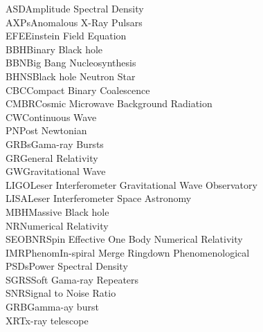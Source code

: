 ASD\hspace{2.4cm}Amplitude Spectral Density\\
AXPs\hspace{2.2cm}Anomalous X-Ray Pulsars\\
EFE\hspace{2.3cm}Einstein Field Equation\\
BBH\hspace{2.3cm}Binary Black hole\\
BBN\hspace{2.3cm}Big Bang Nucleosynthesis\\
BHNS\hspace{2cm}Black hole Neutron Star\\
CBC\hspace{2.3cm}Compact Binary Coalescence\\
CMBR\hspace{1.95cm}Cosmic Microwave Background Radiation\\
CW\hspace{2.55cm}Continuous Wave\\ 
PN\hspace{2.55cm}Post Newtonian\\
GRBs\hspace{2.1cm}Gama-ray Bursts\\
GR\hspace{2.64cm}General Relativity\\
GW\hspace{2.53cm}Gravitational Wave \\
LIGO\hspace{2.2cm}Leser Interferometer Gravitational Wave Observatory\\ 
LISA\hspace{2.3cm}Leser Interferometer Space Astronomy\\
MBH\hspace{2.3cm}Massive Black hole\\
NR\hspace{2.75cm}Numerical Relativity\\
SEOBNR\hspace{1.5cm}Spin Effective One Body Numerical Relativity\\
IMRPhenom\hspace{0.9cm}In-spiral Merge Ringdown Phenomenological\\
PSDs\hspace{2.30cm}Power Spectral Density\\ 
SGRS\hspace{2.2cm}Soft Gama-ray Repeaters\\
SNR\hspace{2.48cm}Signal to Noise Ratio\\  
GRB\hspace{2.48cm}Gamma-ay burst\\ 
XRT\hspace{2.48cm}x-ray telescope\\

